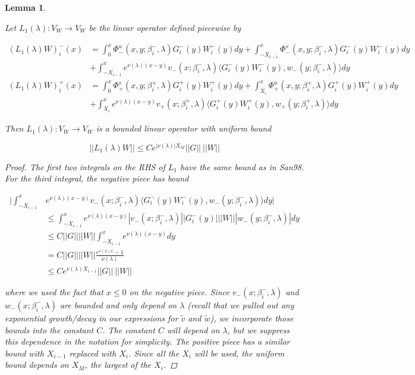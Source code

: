 \documentclass[12pt]{article}
\newtheorem{lemma}{Lemma}
\begin{document}
\begin{lemma}\label{L1}

Let $L_1(\lambda): V_W \rightarrow V_W$ be the linear operator defined piecewise by

\begin{align*}
(L_1(\lambda)W)_i^-(x) &= \int_0^x \Phi^u_-(x, y; \beta_i^-, \lambda) G_i^-(y)W_i^-(y) dy + \int_{-X_{i-1}}^x \Phi^s_-(x, y; \beta_i^-, \lambda) G_i^-(y)W_i^-(y) dy \\
&+ \int_{-X_{i-1}}^x 
e^{\nu(\lambda)(x-y)} v_-(x; \beta_i^-, \lambda) \langle G_i^-(y)W_i^-(y), w_-(y; \beta_i^-, \lambda) \rangle dy \\
(L_1(\lambda)W)_i^+(x) &= \int_0^x \Phi^s_+(x, y; \beta_i^+, \lambda) G_i^+(y) W_i^+(y) dy + \int_{X_i}^x \Phi^u_+(x, y; \beta_i^+, \lambda) G_i^+(y) W_i^+(y) dy \\
&+ \int_{X_i}^x e^{\nu(\lambda)(x-y)} v_+(x; \beta_i^+, \lambda) \langle G_i^+(y)W_i^+(y), w_+(y; \beta_i^+, \lambda) \rangle dy
\end{align*}

Then $L_1(\lambda): V_W \rightarrow V_W$ is a bounded linear operator with uniform bound

\begin{equation}\label{L1bound}
||L_1(\lambda)W|| \leq C e^{|\nu(\lambda)|X_M} ||G|| \: ||W||
\end{equation}

\begin{proof}
The first two integrals on the RHS of $L_1$ have the same bound as in San98. For the third integral, the negative piece has bound

\begin{align*}
\Big| \int_{-X_{i-1}}^x &e^{\nu(\lambda)(x-y)} v_-(x; \beta_i^-, \lambda) \langle G_i^-(y)W_i^-(y), w_-(y; \beta_i^-, \lambda) \rangle dy \Big| \\
&\leq \int_{-X_{i-1}}^x e^{\nu(\lambda)(x-y)} |v_-(x; \beta_i^-, \lambda)| |G_i^-(y)|||W|||w_-(y; \beta_i^-, \lambda)|dy \\
&\leq C ||G||||W|| \int_{-X_{i-1}}^x e^{\nu(\lambda)(x-y)} dy \\
&= C ||G||||W|| \frac{e^{\nu(\lambda)x} - 1}{\nu(\lambda)} \\
&\leq C e^{\nu(\lambda)X_{i-1}} ||G|| \: ||W||
\end{align*}

where we used the fact that $x \leq 0$ on the negative piece. Since $v_-(x; \beta_i^-, \lambda)$ and $w_-(x; \beta_i^-, \lambda)$ are bounded and only depend on $\lambda$ (recall that we pulled out any exponential growth/decay in our expressions for $\tilde{v}$ and $\tilde{w}$), we incorporate those bounds into the constant $C$. The constant $C$ will depend on $\lambda$, but we suppress this dependence in the notation for simplicity. The positive piece has a similar bound with $X_{i-1}$ replaced with $X_i$. Since all the $X_i$ will be used, the uniform bound depends on $X_M$, the largest of the $X_i$.

\end{proof}
\end{lemma}
\end{document}

